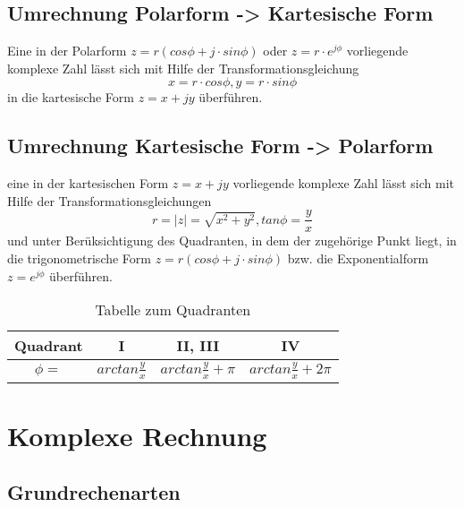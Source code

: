 \subsection{Umrechnung Polarform -> Kartesische Form}
Eine in der Polarform $z = r (cos\phi + j \cdot sin\phi)$ oder $z=r \cdot e^{j\phi}$ vorliegende komplexe Zahl lässt sich mit Hilfe der Transformationsgleichung 
$$ x = r \cdot cos\phi, y = r \cdot sin\phi$$ 
in die kartesische Form $z = x + jy$ überführen.

\subsection{Umrechnung Kartesische Form -> Polarform}
eine in der kartesischen Form $z = x + jy$ vorliegende komplexe Zahl lässt sich mit Hilfe der Transformationsgleichungen 
$$ r = |z| = \sqrt{x^2 + y^2}, tan \phi = \frac{y}{x}$$ 
und unter Berüksichtigung des Quadranten, in dem der zugehörige Punkt liegt, in die trigonometrische Form $z = r(cos\phi + j \cdot sin\phi)$ bzw. die Exponentialform $z=e^{j\phi}$ überführen.
\begin{table}[H]
\begin{tabular}{|c|c|c|c|}
\hline 
Quadrant & I & II, III & IV \\ 
\hline 
$\phi =$ & $arctan \frac{y}{x}$ & $arctan \frac{y}{x}+\pi$ & $arctan \frac{y}{x} + 2\pi$ \\ 
\hline 
\end{tabular}
\caption{Tabelle zum Quadranten}
\end{table} 

\section{Komplexe Rechnung}
\subsection{Grundrechenarten}
